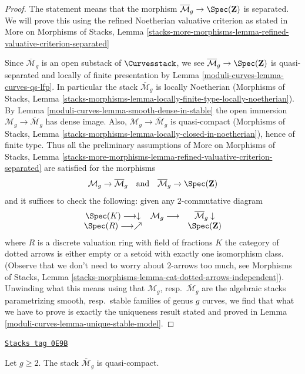 \begin{proof}
The statement means that the morphism
$\overline{\mathcal{M}}_g \to \Spec(\mathbf{Z})$ is separated.
We will prove this using the refined Noetherian valuative criterion
as stated in
More on Morphisms of Stacks, Lemma
\ref{stacks-more-morphisms-lemma-refined-valuative-criterion-separated}

\medskip\noindent
Since $\overline{\mathcal{M}}_g$ is an open substack of
$\Curvesstack$, we see $\overline{\mathcal{M}}_g \to \Spec(\mathbf{Z})$
is quasi-separated and
locally of finite presentation by Lemma \ref{moduli-curves-lemma-curves-qs-lfp}.
In particular the stack $\overline{\mathcal{M}}_g$ is locally
Noetherian (Morphisms of Stacks, Lemma
\ref{stacks-morphisms-lemma-locally-finite-type-locally-noetherian}).
By Lemma \ref{moduli-curves-lemma-smooth-dense-in-stable} the open immersion
$\mathcal{M}_g \to \overline{\mathcal{M}}_g$
has dense image. Also, $\mathcal{M}_g \to \overline{\mathcal{M}}_g$
is quasi-compact (Morphisms of Stacks, Lemma
\ref{stacks-morphisms-lemma-locally-closed-in-noetherian}),
hence of finite type. Thus all the preliminary assumptions
of More on Morphisms of Stacks, Lemma
\ref{stacks-more-morphisms-lemma-refined-valuative-criterion-separated}
are satisfied for the morphisms
$$
\mathcal{M}_g \to \overline{\mathcal{M}}_g
\quad\text{and}\quad
\overline{\mathcal{M}}_g \to \Spec(\mathbf{Z})
$$
and it suffices to check the following: given any $2$-commutative diagram
$$
\begin{array}{ccc}\Spec(K) \longrightarrow\downarrow & \mathcal{M}_g \longrightarrow & \overline{\mathcal{M}}_g \downarrow \\ \Spec(R) \longrightarrow\nearrow &  & \Spec(\mathbf{Z})\end{array}
$$
where $R$ is a discrete valuation ring with field of fractions $K$
the category of dotted arrows is either empty or a setoid with exactly
one isomorphism class. (Observe that we don't need to worry about
$2$-arrows too much, see Morphisms of Stacks, Lemma
\ref{stacks-morphisms-lemma-cat-dotted-arrows-independent}).
Unwinding what this means using that
$\mathcal{M}_g$, resp.\ $\overline{\mathcal{M}}_g$ are
the algebraic stacks parametrizing smooth, resp.\ stable families
of genus $g$ curves, we find that what we have to prove
is exactly the uniqueness result stated and proved in
Lemma \ref{moduli-curves-lemma-unique-stable-model}.
\end{proof}

\begin{lemma}
\label{moduli-curves-lemma-stable-quasi-compact}
\href{https://stacks.math.columbia.edu/tag/0E9B}{\texttt{Stacks tag 0E9B}}

Let $g \geq 2$. The stack $\overline{\mathcal{M}}_g$ is quasi-compact.
\end{lemma}

